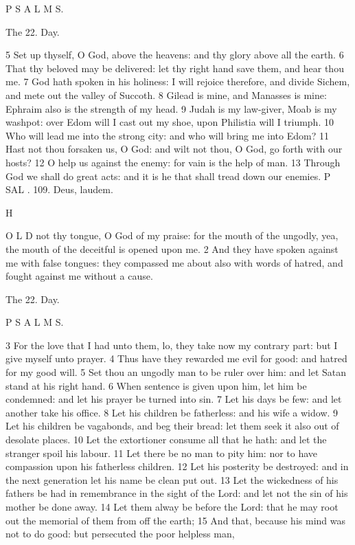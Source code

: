 P S A L M S.

The 22. Day.

5 Set up thyself, O God, above the heavens: and thy glory above all the earth. 6 That thy beloved may be delivered: let thy right hand save them, and hear thou me. 7 God hath spoken in his holiness: I will rejoice therefore, and divide Sichem, and mete out the valley of Succoth. 8 Gilead is mine, and Manasses is mine: Ephraim also is the strength of my head. 9 Judah is my law-giver, Moab is my washpot: over Edom will I cast out my shoe, upon Philistia will I triumph. 10 Who will lead me into the strong city: and who will bring me into Edom? 11 Hast not thou forsaken us, O God: and wilt not thou, O God, go forth with our hosts? 12 O help us against the enemy: for vain is the help of man. 13 Through God we shall do great acts: and it is he that shall tread down our enemies. P SAL . 109. Deus, laudem.

H

O L D not thy tongue, O God of my praise: for the mouth of the ungodly, yea, the mouth of the deceitful is opened upon me. 2 And they have spoken against me with false tongues: they compassed me about also with words of hatred, and fought against me without a cause.

The 22. Day.

P S A L M S.

3 For the love that I had unto them, lo, they take now my contrary part: but I give myself unto prayer. 4 Thus have they rewarded me evil for good: and hatred for my good will. 5 Set thou an ungodly man to be ruler over him: and let Satan stand at his right hand. 6 When sentence is given upon him, let him be condemned: and let his prayer be turned into sin. 7 Let his days be few: and let another take his office. 8 Let his children be fatherless: and his wife a widow. 9 Let his children be vagabonds, and beg their bread: let them seek it also out of desolate places. 10 Let the extortioner consume all that he hath: and let the stranger spoil his labour. 11 Let there be no man to pity him: nor to have compassion upon his fatherless children. 12 Let his posterity be destroyed: and in the next generation let his name be clean put out. 13 Let the wickedness of his fathers be had in remembrance in the sight of the Lord: and let not the sin of his mother be done away. 14 Let them alway be before the Lord: that he may root out the memorial of them from off the earth; 15 And that, because his mind was not to do good: but persecuted the poor helpless man,

